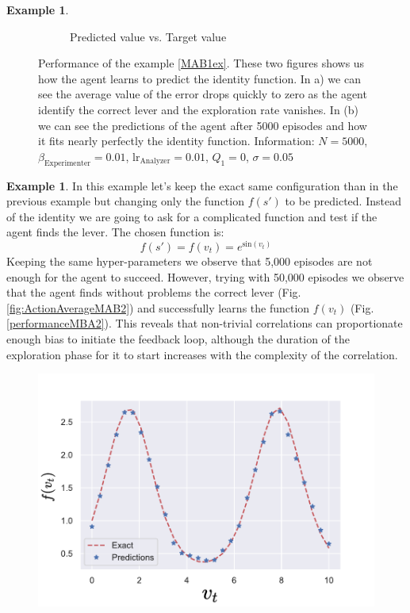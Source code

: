 \documentclass[11pt,a4paper,twoside]{report}
\newcommand{\+}{\textnormal{+} }
\theoremstyle{definition}
\newtheorem{myex}[mythm]{Example}
\numberwithin{equation}{chapter}
\begin{document}
\begin{myex}
\begin{figure}[]
\begin{subfigure}{.5\textwidth}
        \caption{Predicted value vs. Target value}
        \label{fig:predictionsMAB1}
      \end{subfigure}
      \caption{Performance of the example \ref{MAB1ex}. These two figures shows
      us how the agent learns to predict the identity function. In a) we can see
      the average value of the error drops quickly to zero as the agent identify
      the correct lever and the exploration rate vanishes. In (b) we can see the
      predictions of the agent after 5000 episodes and how it fits nearly
      perfectly the identity function. Information: $N=5000$,
      $\beta_\text{Experimenter}=0.01$, $\text{lr}_\text{Analyzer}=0.01$,
      $Q_1=0$, $\sigma=0.05$}
    \end{figure} 
  \end{myex}
  \begin{myex} \label{MAB2ex}
    In this example let's keep the exact same configuration than in the previous
    example but changing only the function $f(s')$ to be predicted. Instead of 
    the identity we are going to ask for a complicated function and test if the
    agent finds the lever. The chosen function is:
    \begin{equation}
      f(s')=f(v_t)= e^{\text{sin}(v_t)}
    \end{equation}
    Keeping the same hyper-parameters we observe that 5,000 episodes are not
    enough for the agent to succeed. However, trying with 50,000 episodes we
    observe that the agent finds without problems the correct lever (Fig.
    \ref{fig:ActionAverageMAB2}) and successfully learns the function $f(v_t)$ (Fig. 
    \ref{performanceMBA2}). This reveals that non-trivial correlations can
    proportionate enough bias to initiate the feedback loop, although the 
    duration of the exploration phase for it to start increases 
    with the complexity of the correlation.


    \begin{figure}
      \centering
      \includegraphics[scale=0.5]{figures/performanceMBA2 edited.pdf}


\end{figure}
\end{myex}
\end{document}
